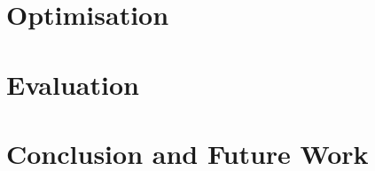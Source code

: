 \documentclass[12pt,twoside]{report}
\begin{document}
\chapter{Optimisation}
\begin{comment}
  - Detail how my optimisation works and how it is implemented
\end{comment}

\chapter{Evaluation}
\begin{comment}
  - Evaluate optimisation...
\end{comment}

\chapter{Conclusion and Future Work}
\begin{comment}
  - Keep this short and just summarise key findings and elaborate on future optimisations/research directions.
\end{comment}




\end{document}
